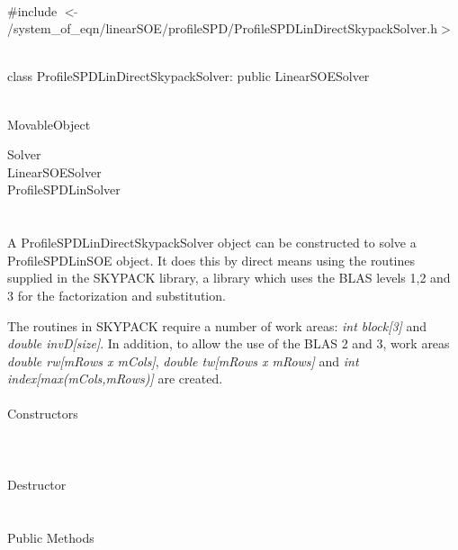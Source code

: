 
   \\
\#include $<\tilde{ }$/system\_of\_eqn/linearSOE/profileSPD/ProfileSPDLinDirectSkypackSolver.h$>$  


  \\
class ProfileSPDLinDirectSkypackSolver: public LinearSOESolver  


 \\
MovableObject 

\indent\indent  Solver \\
\indent\indent\indent LinearSOESolver \\
\indent\indent\indent\indent ProfileSPDLinSolver \\
\indent\indent\indent\indent{} \\

  \\
\indent A ProfileSPDLinDirectSkypackSolver object can be constructed
to solve a ProfileSPDLinSOE object. It does this by direct means using
the routines supplied in the SKYPACK library, a library which uses the
BLAS levels 1,2 and 3 for the factorization and substitution. 

The routines in SKYPACK require a number of work areas: {\em int
block[3]} and {\em double invD[size]}. In addition, to allow the use
of the BLAS 2 and 3, work areas {\em double rw[mRows x mCols]}, {\em
double tw[mRows x mRows]} and {\em int index[max(mCols,mRows)]} are 
created. \\


  \\
\indent\indent Constructors \\
\indent{}  \\ 
\indent{}  \\ \\
\indent\indent Destructor \\
\indent{}\\  \\
\indent\indent Public Methods \\
\indent{} \\
\indent{} \\
\indent{}\\ 
\indent{}\\ 


